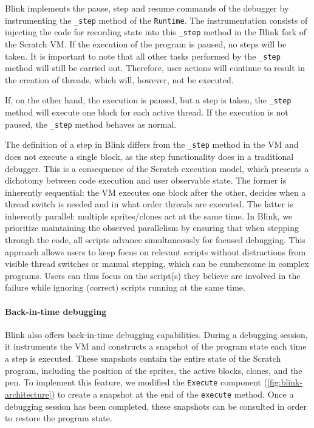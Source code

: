 \documentclass[../main]{subfiles}
\begin{document}
Blink implements the pause, step and resume commands of the debugger by instrumenting the \texttt{\_step} method of the \texttt{Runtime}.
The instrumentation consists of injecting the code for recording state into this \texttt{\_step} method in the Blink fork of the Scratch VM\@.
If the execution of the program is paused, no steps will be taken.
It is important to note that all other tasks performed by the \texttt{\_step} method will still be carried out.
Therefore, user actions will continue to result in the creation of threads, which will, however, not be executed.

If, on the other hand, the execution is paused, but a step is taken, the \texttt{\_step} method will execute one block for each active thread.
If the execution is not paused, the \texttt{\_step} method behaves as normal.

The definition of a step in Blink differs from the \texttt{\_step} method in the VM and does not execute a single block, as the step functionality does in a traditional debugger.
This is a consequence of the Scratch execution model, which presents a dichotomy between code execution and user observable state.
The former is inherently sequential: the VM executes one block after the other, decides when a thread switch is needed and in what order threads are executed.
The latter is inherently parallel: multiple sprites/clones act at the same time.
In Blink, we prioritize maintaining the observed parallelism by ensuring that when stepping through the code, all scripts advance simultaneously for focused debugging.
This approach allows users to keep focus on relevant scripts without distractions from visible thread switches or manual stepping, which can be cumbersome in complex programs.
Users can thus focus on the script(s) they believe are involved in the failure while ignoring (correct) scripts running at the same time.

\paragraph{Back-in-time debugging}
Blink also offers back-in-time debugging capabilities.
During a debugging session, it instruments the VM and constructs a snapshot of the program state each time a step is executed.
These snapshots contain the entire state of the Scratch program, including the position of the sprites, the active blocks, clones, and the pen.
To implement this feature, we modified the \texttt{Execute} component (\vref{fig:blink-architecture}) to create a snapshot at the end of the \texttt{execute} method.
Once a debugging session has been completed, these snapshots can be consulted in order to restore the program state.
\end{document}
